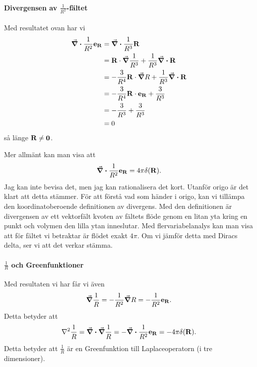 \paragraph{Divergensen av $\frac{1}{R^{2}}$-fältet}
Med resultatet ovan har vi
\begin{align*}
	\div{\frac{1}{R^{2}}\vb{e}_{\vb{\vb{R}}}} &= \div{\frac{1}{R^{3}}\vb{R}} \\
	                                 &= \vb{R}\cdot\grad{\frac{1}{R^{3}}} + \frac{1}{R^{3}}\div{\vb{R}} \\
	                                 &= -\frac{3}{R^{4}}\vb{R}\cdot\grad{R} + \frac{1}{R^{3}}\div{\vb{R}} \\
	                                 &= -\frac{3}{R^{4}}\vb{R}\cdot\vb{e}_{\vb{\vb{R}}} + \frac{3}{R^{3}} \\
	                                 &= -\frac{3}{R^{3}} + \frac{3}{R^{3}} \\
	                                 &= 0
\end{align*}
så länge $\vb{R}\neq\vb{0}$.

Mer allmänt kan man visa att
\begin{align*}
	\div{\frac{1}{R^{2}}\vb{e}_{\vb{\vb{R}}}} = 4\pi\delta(\vb{R}).
\end{align*}
Jag kan inte bevisa det, men jag kan rationalisera det kort. Utanför origo är det klart att detta stämmer. För att förstå vad som händer i origo, kan vi tillämpa den koordinatoberoende definitionen av divergens. Med den definitionen är divergensen av ett vektorfält kvoten av fältets flöde genom en litan yta kring en punkt och volymen den lilla ytan inneslutar. Med flervariabelanalys kan man visa att för fältet vi betraktar är flödet exakt $4\pi$. Om vi jämför detta med Diracs delta, ser vi att det verkar stämma.

\paragraph{$\frac{1}{R}$ och Greenfunktioner}
Med resultaten vi har får vi även
\begin{align*}
	\grad{\frac{1}{R}} = -\frac{1}{R^{2}}\grad{R} = -\frac{1}{R^{2}}\vb{e}_{\vb{\vb{R}}}.
\end{align*}
Detta betyder att
\begin{align*}
	\laplacian{\frac{1}{R}} = \div{\grad{\frac{1}{R}}} = -\div{\frac{1}{R^{2}}\ub{\vb{R}}} = -4\pi\delta(\vb{R}).
\end{align*}
Detta betyder att $\frac{1}{R}$ är en Greenfunktion till Laplaceoperatorn (i tre dimensioner).